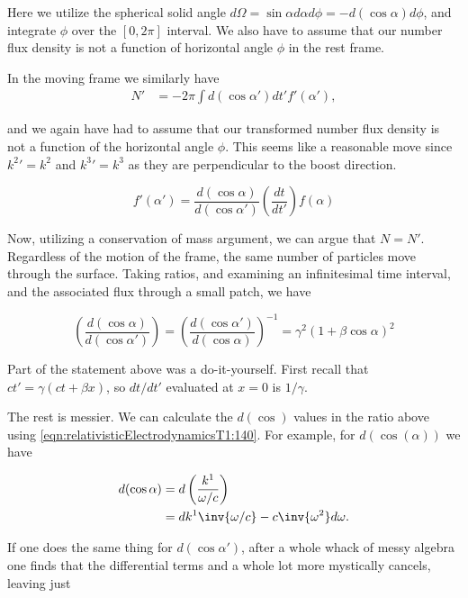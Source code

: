 Here we utilize the spherical solid angle $d\Omega = \sin \alpha d\alpha d\phi = - d(\cos\alpha) d\phi$, and integrate $\phi$ over the $[0, 2\pi]$ interval.  We also have to assume that our number flux density is not a function of horizontal angle $\phi$ in the rest frame.

In the moving frame we similarly have
\begin{align}\label{eqn:relativisticElectrodynamicsT1:160b}
N' &= -2 \pi \int d(\cos\alpha') dt' f'(\alpha'),
\end{align}

and we again have had to assume that our transformed number flux density is not a function of the horizontal angle $\phi$.  This seems like a reasonable move since ${k^2}' = k^2$ and ${k^3}' = k^3$ as they are perpendicular to the boost direction.

\begin{equation}\label{eqn:relativisticElectrodynamicsT1:170}
f'(\alpha') = \frac{d(\cos\alpha)}{d(\cos\alpha')} \left( \frac{dt}{dt'} \right) f(\alpha)
\end{equation}


Now, utilizing a conservation of mass argument, we can argue that $N = N'$.  Regardless of the motion of the frame, the same number of particles move through the surface.  Taking ratios, and examining an infinitesimal time interval, and the associated flux through a small patch, we have

\begin{equation}\label{eqn:relativisticElectrodynamicsT1:180}
\left( \frac{d(\cos\alpha)}{d(\cos\alpha')} \right) = \left( \frac{d(\cos\alpha')}{d(\cos\alpha)} \right)^{-1} = \gamma^2 ( 1 + \beta \cos\alpha)^2
\end{equation}

Part of the statement above was a do-it-yourself.  First recall that $c t' = \gamma ( c t + \beta x )$, so $dt/dt'$ evaluated at $x=0$ is $1/\gamma$.

The rest is messier.  We can calculate the $d(\cos)$ values in the ratio above using \ref{eqn:relativisticElectrodynamicsT1:140}.  For example, for $d(\cos(\alpha))$ we have

\begin{align*}
d(\cos\alpha) 
&= d \left( \frac{k^1}{\omega/c} \right) \\
&= dk^1 \inv{\omega/c} - c \inv{\omega^2} d\omega.
\end{align*}

If one does the same thing for $d(\cos\alpha')$, after a whole whack of messy algebra one finds that the differential terms and a whole lot more mystically cancels, leaving just


